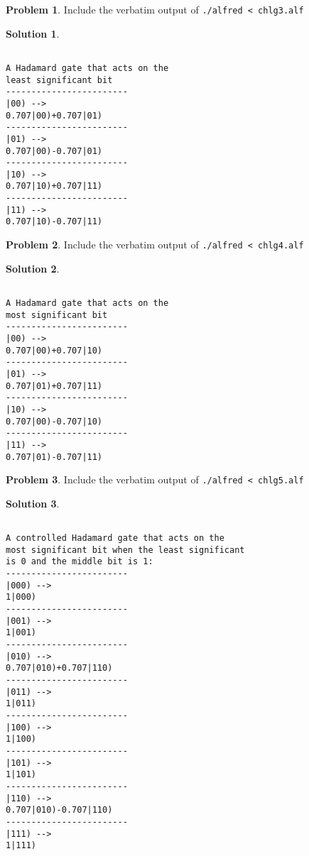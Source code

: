 \documentclass[12pt,a4paper]{article}
\theoremstyle{definition}
\newtheorem{problem}{Problem}
\newtheorem*{solution}{Solution}
\begin{document}
\begin{problem}
Include the verbatim output of \verb|./alfred < chlg3.alf|
\end{problem}
\begin{solution}
\begin{verbatim}
 
A Hadamard gate that acts on the 
least significant bit
------------------------
|00) -->
0.707|00)+0.707|01)
------------------------
|01) -->
0.707|00)-0.707|01)
------------------------
|10) -->
0.707|10)+0.707|11)
------------------------
|11) -->
0.707|10)-0.707|11)
\end{verbatim}
\end{solution}

\begin{problem}
Include the verbatim output of \verb|./alfred < chlg4.alf|
\end{problem}
\begin{solution}
\begin{verbatim}
 
A Hadamard gate that acts on the 
most significant bit
------------------------
|00) -->
0.707|00)+0.707|10)
------------------------
|01) -->
0.707|01)+0.707|11)
------------------------
|10) -->
0.707|00)-0.707|10)
------------------------
|11) -->
0.707|01)-0.707|11)
\end{verbatim}
\end{solution}


\begin{problem}
Include the verbatim output of \verb|./alfred < chlg5.alf|
\end{problem}
\begin{solution}
\begin{verbatim}
 
A controlled Hadamard gate that acts on the 
most significant bit when the least significant
is 0 and the middle bit is 1:
------------------------
|000) -->
1|000)
------------------------
|001) -->
1|001)
------------------------
|010) -->
0.707|010)+0.707|110)
------------------------
|011) -->
1|011)
------------------------
|100) -->
1|100)
------------------------
|101) -->
1|101)
------------------------
|110) -->
0.707|010)-0.707|110)
------------------------
|111) -->
1|111)
\end{verbatim}
\end{solution}
\end{document}
